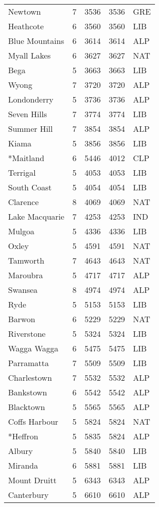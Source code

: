 \documentclass{article}
\begin{document}
\begin{center}
\begin{longtable}{lllll}
Newtown & 7 & 3536 & 3536 & GRE \\
Heathcote & 6 & 3560 & 3560 & LIB \\
Blue Mountains & 6 & 3614 & 3614 & ALP \\
Myall Lakes & 6 & 3627 & 3627 & NAT \\
Bega & 5 & 3663 & 3663 & LIB \\
Wyong & 7 & 3720 & 3720 & ALP \\
Londonderry & 5 & 3736 & 3736 & ALP \\
Seven Hills & 7 & 3774 & 3774 & LIB \\
Summer Hill & 7 & 3854 & 3854 & ALP \\
Kiama & 5 & 3856 & 3856 & LIB \\
*Maitland & 6 & 5446 & 4012 & CLP \\
Terrigal & 5 & 4053 & 4053 & LIB \\
South Coast & 5 & 4054 & 4054 & LIB \\
Clarence & 8 & 4069 & 4069 & NAT \\
Lake Macquarie & 7 & 4253 & 4253 & IND \\
Mulgoa & 5 & 4336 & 4336 & LIB \\
Oxley & 5 & 4591 & 4591 & NAT \\
Tamworth & 7 & 4643 & 4643 & NAT \\
Maroubra & 5 & 4717 & 4717 & ALP \\
Swansea & 8 & 4974 & 4974 & ALP \\
Ryde & 5 & 5153 & 5153 & LIB \\
Barwon & 6 & 5229 & 5229 & NAT \\
Riverstone & 5 & 5324 & 5324 & LIB \\
Wagga Wagga & 6 & 5475 & 5475 & LIB \\
Parramatta & 7 & 5509 & 5509 & LIB \\
Charlestown & 7 & 5532 & 5532 & ALP \\
Bankstown & 6 & 5542 & 5542 & ALP \\
Blacktown & 5 & 5565 & 5565 & ALP \\
Coffs Harbour & 5 & 5824 & 5824 & NAT \\
*Heffron & 5 & 5835 & 5824 & ALP \\
Albury & 5 & 5840 & 5840 & LIB \\
Miranda & 6 & 5881 & 5881 & LIB \\
Mount Druitt & 5 & 6343 & 6343 & ALP \\
Canterbury & 5 & 6610 & 6610 & ALP \\

\end{longtable}
\end{center}
\end{document}
